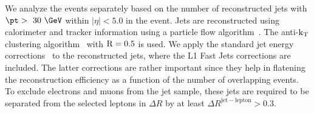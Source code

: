 We analyze the events separately based on the number of reconstructed 
jets with $\pt > ~30~\GeV$ within $|\eta|<5.0$ in the event. 
Jets are reconstructed using calorimeter and tracker information using a particle flow 
algorithm~\cite{jetpas}. The anti-${\rm k_T}$ clustering algorithm~\cite{antikt} 
with ${\rm R=0.5}$ is used. We apply the standard jet energy 
corrections~\cite{jes} to the reconstructed jets, where the L1 Fast Jets 
corrections are included. The latter corrections are rather important since 
they help in flatening the reconstruction efficiency as a function of the 
number of overlapping events.
To exclude electrons and muons from the jet sample, these 
jets are required to be separated from the selected leptons in $\Delta R$ 
by at least $\Delta R^{\mathrm{jet-lepton}}>0.3$.

